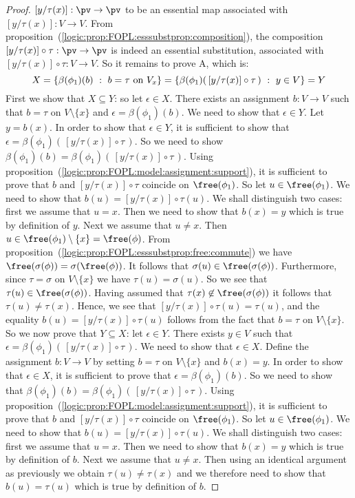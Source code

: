 \begin{proof}
$[y/\tau(x)]:\pv\to\pv$ to be an essential map associated with
$[y/\tau(x)]:V\to V$. From
proposition~(\ref{logic:prop:FOPL:esssubstprop:composition}), the
composition $[y/\tau(x)]\circ\tau:\pv\to\pv$ is indeed an essential
substitution, associated with $[y/\tau(x)]\circ\tau: V\to V$. So it
remains to prove A, which is:
    \[
    X=\left\{\beta(\phi_{1})(b)\ :\ b=\tau\mbox{\ on\
    }V_{x}\right\}=\left\{\beta(\phi_{1})(\,[y/\tau(x)]\circ\tau\,)\ :\ y\in
    V\right\}=Y
    \]
First we show that $X\subseteq Y$: so let $\epsilon\in X$. There
exists an assignment $b:V\to V$ such that $b=\tau$ on
$V\setminus\{x\}$ and $\epsilon=\beta(\phi_{1})(b)$. We need to show
that $\epsilon\in Y$. Let $y=b(x)$. In order to show that
$\epsilon\in Y$, it is sufficient to show that $\epsilon
=\beta(\phi_{1})(\,[y/\tau(x)]\circ\tau\,)$. So we need to show
$\beta(\phi_{1})(b)=\beta(\phi_{1})(\,[y/\tau(x)]\circ\tau\,)$.
Using proposition~(\ref{logic:prop:FOPL:model:assignment:support}),
it is sufficient to prove that $b$ and $[y/\tau(x)]\circ\tau$
coincide on $\free(\phi_{1})$. So let $u\in\free(\phi_{1})$. We need
to show that $b(u)=[y/\tau(x)]\circ\tau(u)$. We shall distinguish
two cases: first we assume that $u=x$. Then we need to show that
$b(x)=y$ which is true by definition of $y$. Next we assume that
$u\neq x$. Then $u\in\free(\phi_{1})\setminus\{x\}=\free(\phi)$.
From proposition~(\ref{logic:prop:FOPL:esssubstprop:free:commute})
we have $\free(\sigma(\phi))=\sigma(\free(\phi))$. It follows that
$\sigma(u)\in\free(\sigma(\phi))$. Furthermore, since $\tau=\sigma$
on $V\setminus\{x\}$ we have $\tau(u)=\sigma(u)$. So we see that
$\tau(u)\in\free(\sigma(\phi))$. Having assumed that
$\tau(x)\not\in\free(\sigma(\phi))$ it follows that
$\tau(u)\neq\tau(x)$. Hence, we see that
$[y/\tau(x)]\circ\tau(u)=\tau(u)$, and the equality
$b(u)=[y/\tau(x)]\circ\tau(u)$ follows from the fact that $b=\tau$
on $V\setminus\{x\}$. So we now prove that $Y\subseteq X$: let
$\epsilon\in Y$. There exists $y\in V$ such that
$\epsilon=\beta(\phi_{1})(\,[y/\tau(x)]\circ\tau\,)$. We need to
show that $\epsilon\in X$. Define the assignment $b:V\to V$ by
setting $b=\tau$ on $V\setminus\{x\}$ and $b(x)=y$. In order to show
that $\epsilon\in X$, it is sufficient to prove that $\epsilon
=\beta(\phi_{1})(b)$. So we need to show that
$\beta(\phi_{1})(b)=\beta(\phi_{1})(\,[y/\tau(x)]\circ\tau\,)$.
Using proposition~(\ref{logic:prop:FOPL:model:assignment:support}),
it is sufficient to prove that $b$ and $[y/\tau(x)]\circ\tau$
coincide on $\free(\phi_{1})$. So let $u\in\free(\phi_{1})$. We need
to show that $b(u)=[y/\tau(x)]\circ\tau(u)$. We shall distinguish
two cases: first we assume that $u=x$. Then we need to show that
$b(x)=y$ which is true by definition of $b$. Next we assume that
$u\neq x$. Then using an identical argument as previously we obtain
$\tau(u)\neq\tau(x)$ and we therefore need to show that
$b(u)=\tau(u)$ which is true by definition of $b$.
\end{proof}
